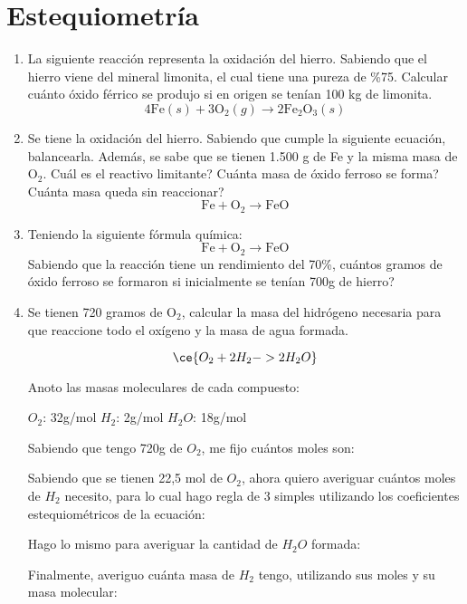 \section{Estequiometría}

\begin{enumerate}
\item La siguiente reacción representa la oxidación del hierro.
Sabiendo que el hierro viene del mineral limonita, el
cual tiene una pureza de \%75. Calcular cuánto óxido férrico
se produjo si en origen se tenían 100 kg de limonita.
$$4\text{Fe} (s) + 3\text{O}_2 (g) \rightarrow 2\text{Fe}_2\text{O}_3 (s)$$

\item Se tiene la oxidación del hierro. Sabiendo que cumple la siguiente ecuación, balancearla. Además, se sabe que se tienen 1.500 g de Fe y la misma masa de O$_2$. Cuál es el reactivo limitante? Cuánta masa de óxido ferroso se forma? Cuánta masa queda sin reaccionar?
$$\text{Fe} + \text{O}_2 \rightarrow \text{Fe}\text{O}$$


\item Teniendo la siguiente fórmula química:
$$\text{Fe} + \text{O}_2 \rightarrow \text{Fe}\text{O}$$
Sabiendo que la reacción tiene un rendimiento del 70\%, cuántos gramos de óxido ferroso se formaron si inicialmente se tenían 700g de hierro?


\item Se tienen 720 gramos de O$_2$, calcular la masa del hidrógeno
necesaria para que reaccione todo el oxígeno y la masa de 
agua formada.

$$\ce{O_2 + 2H_2 -> 2H_2O}$$

Anoto las masas moleculares de cada compuesto:

\hfil$O_2$: 32g/mol\hfil
$H_2$: 2g/mol\hfil
$H_2O$: 18g/mol\hfil

\skipline
Sabiendo que tengo 720g de $O_2$, me fijo cuántos moles son:

Sabiendo que se tienen 22,5 mol de $O_2$, ahora quiero averiguar cuántos moles de $H_2$ necesito, para lo cual hago regla de 3 simples utilizando los coeficientes estequiométricos de la ecuación:

Hago lo mismo para averiguar la cantidad de $H_2O$ formada:

Finalmente, averiguo cuánta masa de $H_2$ tengo, utilizando sus moles y su masa molecular:


\end{enumerate}
